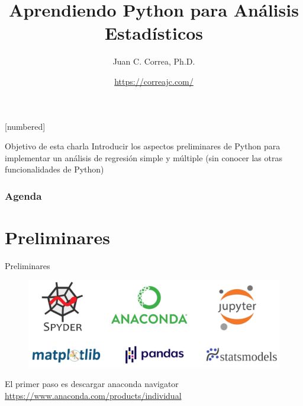 \documentclass{beamer}
\begin{document}




\author[Juan C. Correa, Ph.D.]{Juan C. Correa, Ph.D.}
\title[Análisis Estadísticos en Python]{Aprendiendo Python para Análisis Estadísticos}
[numbered]
\date[Mayo 2021]{\textcolor{blue}{\url{https://correajc.com/}}}


\begin{frame}
	\titlepage
\end{frame}

\begin{frame}
\begin{block}{Objetivo de esta charla}
\vspace{0.3cm}
Introducir los aspectos preliminares de Python para implementar un análisis de regresión simple y múltiple (sin conocer las otras funcionalidades de Python)  \end{block}
\end{frame}

\begin{frame}
\frametitle{Agenda} 
\tableofcontents
\end{frame}



\section{Preliminares}
\begin{frame}{Preliminares}
 \begin{figure}
\includegraphics[width=1\textwidth]{tools.png}
\end{figure}
El primer paso es descargar anaconda navigator \textcolor{blue}{\url{https://www.anaconda.com/products/individual}}
\end{frame}
\end{document}

